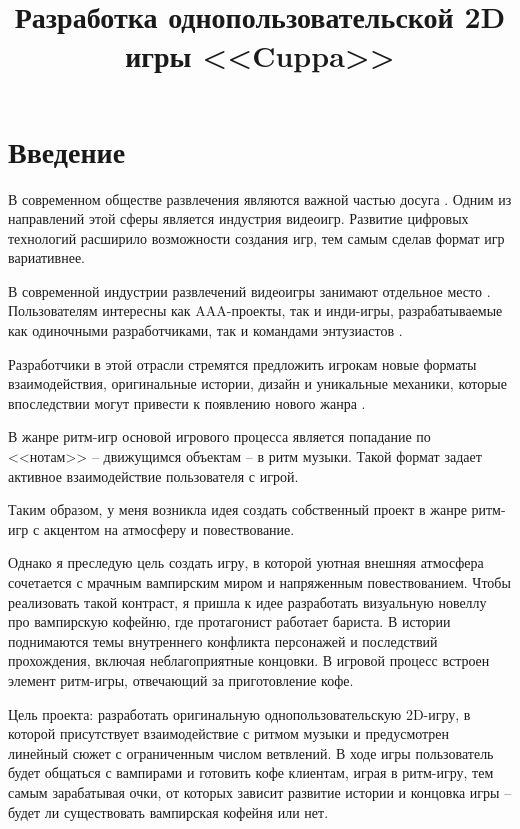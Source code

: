 \documentclass[utf8, russian]{eskdtext}
\title{Разработка однопользовательской 2D игры <<Cuppa>>}
\numberwithin{equation}{section}
\let\stdsection\section
\renewcommand \section{\newpage\stdsection}
\begin{document}
\maketitle
\tableofcontents

\sloppy

\section*{Введение}

В современном обществе развлечения являются важной частью досуга \cite{esa2024}. Одним из направлений этой сферы является индустрия видеоигр. Развитие цифровых технологий расширило возможности создания игр, тем самым сделав формат игр вариативнее.

В современной индустрии развлечений видеоигры занимают отдельное место \cite{esa2024}\cite{newzoo2025}. Пользователям интересны как AAA-проекты, так и инди-игры, разрабатываемые как одиночными разработчиками, так и командами энтузиастов \cite{newzoo2025}\cite{steam2024}.

Разработчики в этой отрасли стремятся предложить игрокам новые форматы взаимодействия, оригинальные истории, дизайн и уникальные механики, которые впоследствии могут привести к появлению нового жанра \cite{narrative2022}.

В жанре ритм-игр основой игрового процесса является попадание по <<нотам>> -- движущимся объектам -- в ритм музыки. Такой формат задает активное взаимодействие пользователя с игрой.

Таким образом, у меня возникла идея создать собственный проект в жанре ритм-игр с акцентом на атмосферу и повествование.

Однако я преследую цель создать игру, в которой уютная внешняя атмосфера сочетается с мрачным вампирским миром и напряженным повествованием. Чтобы реализовать такой контраст, я пришла к идее разработать визуальную новеллу про вампирскую кофейню, где протагонист работает бариста. В истории поднимаются темы внутреннего конфликта персонажей и последствий прохождения, включая неблагоприятные концовки. В игровой процесс встроен элемент ритм-игры, отвечающий за приготовление кофе.

Цель проекта:  разработать оригинальную однопользовательскую 2D-игру, в которой присутствует взаимодействие с ритмом музыки и предусмотрен линейный сюжет с ограниченным числом ветвлений. В ходе игры пользователь будет общаться с вампирами и готовить кофе клиентам, играя в ритм-игру, тем самым зарабатывая очки, от которых зависит развитие истории и концовка игры -- будет ли существовать вампирская кофейня или нет.
\end{document}
